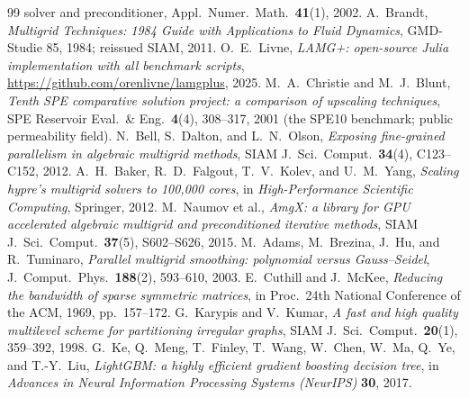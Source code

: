 \documentclass{siamart220329}
\begin{document}
\begin{thebibliography}{99}
{solver and preconditioner}, Appl.\ Numer.\ Math.\ \textbf{41}(1), 2002.
 A.~Brandt, \emph{Multigrid Techniques: 1984 Guide with Applications to Fluid
Dynamics}, GMD-Studie 85, 1984; reissued SIAM, 2011.
 O.~E.~Livne, \emph{LAMG+: open-source Julia implementation with all
benchmark scripts}, \url{https://github.com/orenlivne/lamgplus}, 2025.
 M.~A.~Christie and M.~J.~Blunt, \emph{Tenth SPE comparative solution
project: a comparison of upscaling techniques}, SPE Reservoir Eval.\ \& Eng.\ \textbf{4}(4),
308--317, 2001 (the SPE10 benchmark; public permeability field).
 N.~Bell, S.~Dalton, and L.~N.~Olson, \emph{Exposing fine-grained
parallelism in algebraic multigrid methods}, SIAM J.\ Sci.\ Comput.\ \textbf{34}(4), C123--C152, 2012.
 A.~H.~Baker, R.~D.~Falgout, T.~V.~Kolev, and U.~M.~Yang, \emph{Scaling
hypre's multigrid solvers to 100{,}000 cores}, in \emph{High-Performance Scientific Computing},
Springer, 2012.
 M.~Naumov et al., \emph{AmgX: a library for GPU accelerated algebraic multigrid and
preconditioned iterative methods}, SIAM J.\ Sci.\ Comput.\ \textbf{37}(5), S602--S626, 2015.
 M.~Adams, M.~Brezina, J.~Hu, and R.~Tuminaro, \emph{Parallel multigrid
smoothing: polynomial versus Gauss--Seidel}, J.\ Comput.\ Phys.\ \textbf{188}(2), 593--610, 2003.
 E.~Cuthill and J.~McKee, \emph{Reducing the bandwidth of sparse symmetric
matrices}, in Proc.\ 24th National Conference of the ACM, 1969, pp.~157--172.
 G.~Karypis and V.~Kumar, \emph{A fast and high quality multilevel scheme for
partitioning irregular graphs}, SIAM J.\ Sci.\ Comput.\ \textbf{20}(1), 359--392, 1998.
 G.~Ke, Q.~Meng, T.~Finley, T.~Wang, W.~Chen, W.~Ma, Q.~Ye, and T.-Y.~Liu,
\emph{LightGBM: a highly efficient gradient boosting decision tree}, in \emph{Advances in Neural
Information Processing Systems (NeurIPS)} \textbf{30}, 2017.
\end{thebibliography}
\end{document}
